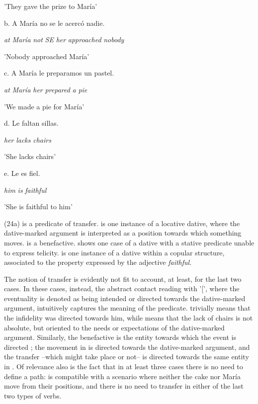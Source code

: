 \documentclass[output=paper,modfonts,nonflat]{langsci/langscibook}
\begin{document}
    {}'They gave the prize to María' 

    b.   A María  no  se  le   acercó      nadie.    

          \textit{at} \textit{María} \textit{not} \textit{SE} \textit{her} \textit{approached} \textit{nobody}

    {}'Nobody approached María'

    c.   A María  le   preparamos un pastel.    

          \textit{at} \textit{María} \textit{her}   \textit{prepared}      \textit{a}   \textit{pie}

    {}'We made a pie for María'

    d.   Le  faltan sillas.        

          \textit{her} \textit{lacks}  \textit{chairs}

    {}'She lacks chairs'

    e.  Le   es fiel.          

         \textit{him} \textit{is}  \textit{faithful}

    {}'She is faithful to him'

(24a) is a predicate of transfer.  is one instance of a locative dative, where the dative-marked argument is interpreted as a position towards which something moves.  is a benefactive.  shows one case of a dative with a stative predicate unable to express telicity.  is one instance of a dative within a copular structure, associated to the property expressed by the adjective \textit{faithful}. 

The notion of transfer is evidently not fit to account, at least, for the last two cases. In these cases, instead, the abstract contact reading with '[', where the eventuality is denoted as being intended or directed towards the dative-marked argument, intuitively captures the meaning of the predicate.  trivially means that the infidelity was directed towards him, while  means that the lack of chairs is not absolute, but oriented to the needs or expectations of the dative-marked argument. Similarly, the benefactive is the entity towards which the event is directed ; the movement in  is directed towards the dative-marked argument, and the transfer –which might take place or not– is directed towards the same entity in . Of relevance also is the fact that in at least three cases there is no need to define a path:  is compatible with a scenario where neither the cake nor María move from their positions, and there is no need to transfer in either of the last two types of verbs.  
\end{document}
